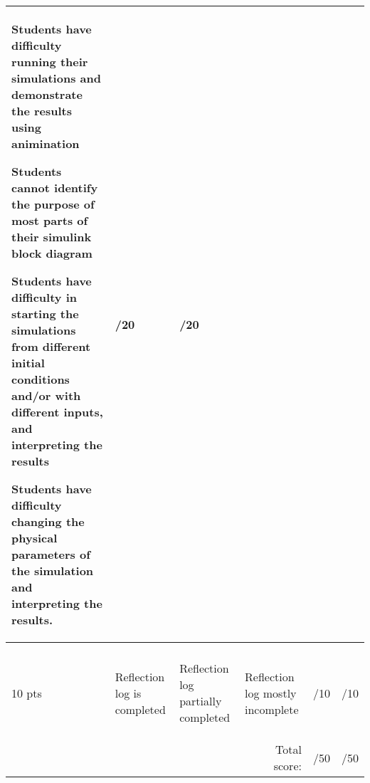 \documentclass[11pt,landscape]{amsart}
\begin{document}
\begin{tabular}{llllcc}
\begin{minipage}{2.5in}\begin{list}{}{\leftmargin=1em}
\item Students have difficulty running their simulations and demonstrate the results using animination
\item Students cannot identify the purpose of most parts of their simulink block diagram
\item Students have difficulty in starting the simulations from different initial conditions and/or with different inputs, and interpreting the results
\item Students have difficulty changing the physical parameters of the simulation and interpreting the results.
\end{list}
\end{minipage}
 & \underline{\hspace{.25in}}/20 &\underline{\hspace{.25in}}/20\\[2pt]\midrule
 

\begin{sideways}\hspace{-.5in}\begin{minipage}{1in}\begin{center}\textbf{Reflection Logs} \\ 10 pts\end{center}\end{minipage}\end{sideways}  &

\begin{minipage}{2.5in} \begin{list}{}{\leftmargin=1em}
\item  Reflection log is completed 
\end{list}
\end{minipage}\vspace{.5in}

&

\begin{minipage}{2.5in}\begin{list}{}{\leftmargin=1em}
\item  Reflection log partially completed \end{list}
\end{minipage}

&

\begin{minipage}{2.5in}\begin{list}{}{\leftmargin=1em}
\item Reflection log mostly incomplete
\end{list}
\end{minipage}
& \underline{\hspace{.25in}}/10 &\underline{\hspace{.25in}}/10\\[2pt]\midrule


 & & \multicolumn{1}{r}{} & \multicolumn{1}{r}{Total score:}& \underline{\hspace{.25in}}/50 &\underline{\hspace{.25in}}/50

\end{tabular}
\end{document}
